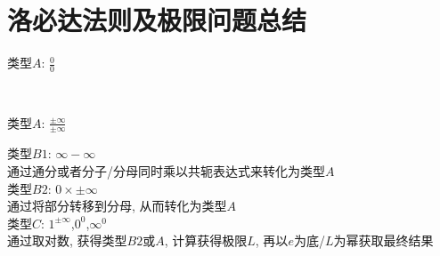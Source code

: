 \chapter{洛必达法则及极限问题总结}
类型$A$: $\displaystyle\frac{0}{0}$
{\par\raggedright
{}\
\par}\vspace{2ex}

类型$A$: $\displaystyle\frac{\pm\infty}{\pm\infty}$
{\par\raggedright
{}
\par}\vspace{2ex}

类型$B1$: $\infty -\infty$\\
通过通分或者分子/分母同时乘以共轭表达式来转化为类型$A$\\

类型$B2$: $0\times\pm\infty$\\
通过将部分转移到分母, 从而转化为类型$A$\\

类型$C$: $1^{\pm\infty}$,$0^0$,$\infty^0$\\
通过取对数, 获得类型$B2$或$A$, 计算获得极限$L$, 再以$e$为底/$L$为幂获取最终结果
